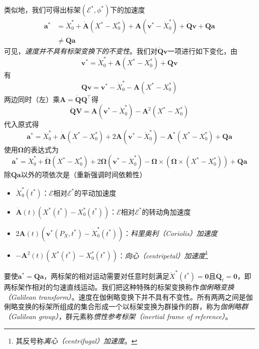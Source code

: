 \documentclass[main.tex]{subfiles}
\begin{document}
类似地，我们可得出标架$\left(\mathcal{E}^*,\phi^*\right)$下的加速度
\begin{align*}
    \mathbf{a}^* & =\ddot{X}^*_0+\dot{\mathbf{A}}\left(X^*-X^*_0\right)+\mathbf{A}\left(\mathbf{v}^*-\dot{X}^*_0\right)+\dot{\mathbf{Q}}\mathbf{v}+\mathbf{Qa} \\
                 & \neq\mathbf{Qa}
\end{align*}
可见，\emph{速度并不具有标架变换下的不变性}。我们对$\dot{\mathbf{Q}}\mathbf{v}$一项进行如下变化，由
\[\mathbf{v}^*=\dot{X}^*_0+\mathbf{A}\left(X^*-X^*_0\right)+\mathbf{Qv}\]
有
\[\mathbf{Qv}=\mathbf{v}^*-\dot{X}^*_0-\mathbf{A}\left(X^*-X^*_0\right)\]
两边同时（左）乘$\mathbf{A}=\dot{\mathbf{Q}}\mathbf{Q}^\intercal$得
\[\dot{\mathbf{Q}}\mathbf{V}=\mathbf{A}\left(\mathbf{v}^*-\dot{X}^*_0\right)-\mathbf{A}^2\left(X^*-X^*_0\right)\]
代入原式得
\[\mathbf{a}^*=\ddot{X}_0^*+\dot{\mathbf{A}}\left(X^*-X^*_0\right)+2\mathbf{A}\left(\mathbf{v}^*-\dot{X}^*_0\right)-\mathbf{A}^*\left(X^*-X^*_0\right)+\mathbf{Qa}\]
使用$\symbf{\Omega}$的表达式为
\[\mathbf{a}^*=\ddot{X}_0^*+\dot{\symbf{\Omega}}\left(X^*-X^*_0\right)+2\symbf{\Omega}\left(\mathbf{v}^*-\dot{X}_0^*\right)-\symbf{\Omega}\times\left(\symbf{\Omega}\times\left(X^*-X^*_0\right)\right)+\mathbf{Qa}\]
除$\mathbf{Qa}$以外的项依次是（重新强调时间依赖性）
\begin{itemize}
    \item $\ddot{X}_0^*\left(t^*\right)$：$\mathcal{E}$相对$\mathcal{E}^*$的平动加速度
    \item $\dot{\mathbf{A}}\left(t\right)\left(X^*\left(t^*\right)-X_0^*\left(t^*\right)\right)$：$\mathcal{E}$相对$\mathcal{E}^*$的转动角加速度
    \item $2\mathbf{A}\left(t\right)\left(\mathbf{v}^*\left(P_X,t^*\right)-\dot{X}_0^*\left(t^*\right)\right)$：\emph{科里奥利（Coriolis）加速度}
    \item $-\mathbf{A}^2\left(t\right)\left(X^*\left(t^*\right)-X^*_0\left(t^*\right)\right)$：\emph{向心（centripetal）加速度}\footnote{其反号称\emph{离心（centrifugal）加速度}。}
\end{itemize}
要使$\mathbf{a}^*=\mathbf{Qa}$，两标架的相对运动需要对任意时刻满足$\ddot{X}^*\left(t^*\right)=\mathbf{0}$且$\dot{\mathbf{Q}}_t=\mathbf{0}$，即两标架作相对的匀速直线运动。我们把这种特殊的标架变换称作\emph{伽俐略变换（Galilean transform）}。速度在伽俐略变换下并不具有不变性。所有两两之间是伽俐略变换的标架所组成的集合形成一个以标架变换为群操作的群，称为\emph{伽俐略群（Galilean group）}，群元素称\emph{惯性参考标架（inertial frame of reference）}。
\end{document}

